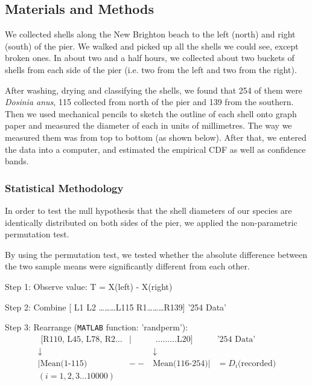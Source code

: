 \subsection{Materials and Methods}

We collected shells along the New Brighton beach to the left (north) and right (south) of the pier. We walked and picked up all the shells we could see, except broken ones. In about two and a half hours, we collected about two buckets of shells from each side of the pier (i.e. two from the left and two from the right). 

After washing, drying and classifying the shells, we found that 254 of them were \textit{Dosinia anus}, 115 collected from north of the pier and 139 from the southern. Then we used mechanical pencils to sketch the outline of each shell onto graph paper and measured the diameter of each in units of millimetres. The way we measured them was from top to bottom (as shown below). After that, we entered the data into a computer, and estimated the empirical CDF as well as confidence bands. 


\subsubsection*{Statistical Methodology }

In order to test the null hypothesis that the shell diameters of our species are identically distributed on both sides of the pier, we applied the non-parametric permutation test. 

By using the permutation test, we tested whether the absolute difference between the two sample means were significantly different from each other.


Step 1: Observe value: T = X(left) - X(right)
                                
Step 2: Combine [ L1 L2 \ldots \ldots \ldots L115 R1\ldots \ldots \ldots R139] '254 Data'

Step 3: Rearrange ({\tt MATLAB} function: 'randperm'):
\begin{displaymath}
\begin{array}{cccc}
           \textrm{ [R110, L45, L78, R2\ldots}& |&\textrm{ \ldots \ldots \ldots L20] } & \textrm{'254 Data'}\\
									\downarrow &&\downarrow\\
                      |\textrm{Mean(1-115)}& --& \textrm{Mean(116-254)}| &= D_i \textrm{(recorded)}\\
		(i = 1, 2, 3 \ldots 10000) &&&
\end{array}
\end{displaymath}


